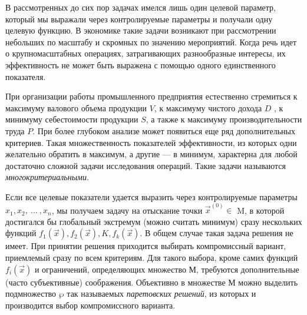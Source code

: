 {В рассмотренных до сих пор задачах имелся лишь один целевой параметр, который  мы  выражали  через контролируемые параметры и получали одну целевую функцию. В экономике такие задачи возникают при рассмотрении небольших по масштабу и скромных по значению мероприятий. Когда речь идет о крупномасштабных операциях, затрагивающих разнообразные интересы, их эффективность не может быть выражена с помощью одного единственного показателя.

При организации  работы  промышленного  предприятия   естественно стремиться к максимуму валового объема продукции $V$, к максимуму чистого дохода $D$ , к минимуму себестоимости  продукции $S$, а также к максимуму производительности труда $P$. При более глубоком анализе может появиться еще ряд дополнительных критериев. Такая множественность показателей эффективности, из которых одни желательно обратить в максимум, а другие — в минимум,  характерна для любой  достаточно  сложной  задачи исследования операций. Такие задачи называются \textit{многокритериальными}.

Если все целевые показатели удается выразить через контролируемые параметры  $x_{1}, x_{2},\:...\:, x_{n}$, мы получаем задачу на отыскание точки $\vec{x}^{(0)}\in $ M, в которой достигался бы глобальный экстремум (можно считать минимум) сразу нескольких функций $f_{1}(\vec{x}), f_{2}(\vec{x}), K, f_{k}(\vec{x})$. В общем случае такая задача решения не имеет. При принятии решения приходится выбирать компромиссный вариант, приемлемый сразу по всем критериям. Для такого выбора, кроме самих функций  $f_{i}(\vec{x})$ и ограничений, определяющих множество М, требуются дополнительные (часто субъективные) соображения. Объективно в множестве М можно выделить подмножество $\wp $ так называемых \textit{паретовских решений}, из которых и производится выбор компромиссного варианта.

}

